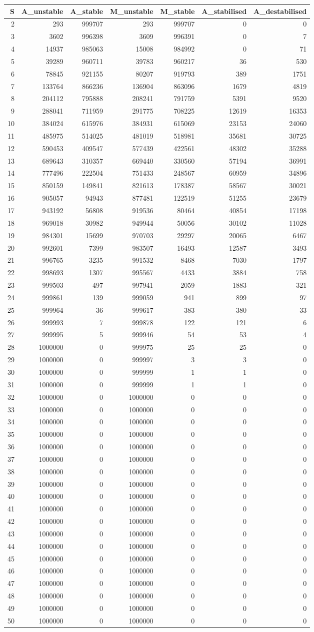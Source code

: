 \documentclass[]{article}
\begin{document}
\begin{longtable}[]{@{}rrrrrrr@{}}
\toprule
S & A\_unstable & A\_stable & M\_unstable & M\_stable & A\_stabilised &
A\_destabilised\tabularnewline
\midrule
\endhead
2 & 293 & 999707 & 293 & 999707 & 0 & 0\tabularnewline
3 & 3602 & 996398 & 3609 & 996391 & 0 & 7\tabularnewline
4 & 14937 & 985063 & 15008 & 984992 & 0 & 71\tabularnewline
5 & 39289 & 960711 & 39783 & 960217 & 36 & 530\tabularnewline
6 & 78845 & 921155 & 80207 & 919793 & 389 & 1751\tabularnewline
7 & 133764 & 866236 & 136904 & 863096 & 1679 & 4819\tabularnewline
8 & 204112 & 795888 & 208241 & 791759 & 5391 & 9520\tabularnewline
9 & 288041 & 711959 & 291775 & 708225 & 12619 & 16353\tabularnewline
10 & 384024 & 615976 & 384931 & 615069 & 23153 & 24060\tabularnewline
11 & 485975 & 514025 & 481019 & 518981 & 35681 & 30725\tabularnewline
12 & 590453 & 409547 & 577439 & 422561 & 48302 & 35288\tabularnewline
13 & 689643 & 310357 & 669440 & 330560 & 57194 & 36991\tabularnewline
14 & 777496 & 222504 & 751433 & 248567 & 60959 & 34896\tabularnewline
15 & 850159 & 149841 & 821613 & 178387 & 58567 & 30021\tabularnewline
16 & 905057 & 94943 & 877481 & 122519 & 51255 & 23679\tabularnewline
17 & 943192 & 56808 & 919536 & 80464 & 40854 & 17198\tabularnewline
18 & 969018 & 30982 & 949944 & 50056 & 30102 & 11028\tabularnewline
19 & 984301 & 15699 & 970703 & 29297 & 20065 & 6467\tabularnewline
20 & 992601 & 7399 & 983507 & 16493 & 12587 & 3493\tabularnewline
21 & 996765 & 3235 & 991532 & 8468 & 7030 & 1797\tabularnewline
22 & 998693 & 1307 & 995567 & 4433 & 3884 & 758\tabularnewline
23 & 999503 & 497 & 997941 & 2059 & 1883 & 321\tabularnewline
24 & 999861 & 139 & 999059 & 941 & 899 & 97\tabularnewline
25 & 999964 & 36 & 999617 & 383 & 380 & 33\tabularnewline
26 & 999993 & 7 & 999878 & 122 & 121 & 6\tabularnewline
27 & 999995 & 5 & 999946 & 54 & 53 & 4\tabularnewline
28 & 1000000 & 0 & 999975 & 25 & 25 & 0\tabularnewline
29 & 1000000 & 0 & 999997 & 3 & 3 & 0\tabularnewline
30 & 1000000 & 0 & 999999 & 1 & 1 & 0\tabularnewline
31 & 1000000 & 0 & 999999 & 1 & 1 & 0\tabularnewline
32 & 1000000 & 0 & 1000000 & 0 & 0 & 0\tabularnewline
33 & 1000000 & 0 & 1000000 & 0 & 0 & 0\tabularnewline
34 & 1000000 & 0 & 1000000 & 0 & 0 & 0\tabularnewline
35 & 1000000 & 0 & 1000000 & 0 & 0 & 0\tabularnewline
36 & 1000000 & 0 & 1000000 & 0 & 0 & 0\tabularnewline
37 & 1000000 & 0 & 1000000 & 0 & 0 & 0\tabularnewline
38 & 1000000 & 0 & 1000000 & 0 & 0 & 0\tabularnewline
39 & 1000000 & 0 & 1000000 & 0 & 0 & 0\tabularnewline
40 & 1000000 & 0 & 1000000 & 0 & 0 & 0\tabularnewline
41 & 1000000 & 0 & 1000000 & 0 & 0 & 0\tabularnewline
42 & 1000000 & 0 & 1000000 & 0 & 0 & 0\tabularnewline
43 & 1000000 & 0 & 1000000 & 0 & 0 & 0\tabularnewline
44 & 1000000 & 0 & 1000000 & 0 & 0 & 0\tabularnewline
45 & 1000000 & 0 & 1000000 & 0 & 0 & 0\tabularnewline
46 & 1000000 & 0 & 1000000 & 0 & 0 & 0\tabularnewline
47 & 1000000 & 0 & 1000000 & 0 & 0 & 0\tabularnewline
48 & 1000000 & 0 & 1000000 & 0 & 0 & 0\tabularnewline
49 & 1000000 & 0 & 1000000 & 0 & 0 & 0\tabularnewline
50 & 1000000 & 0 & 1000000 & 0 & 0 & 0\tabularnewline
\bottomrule
\end{longtable}
\end{document}
